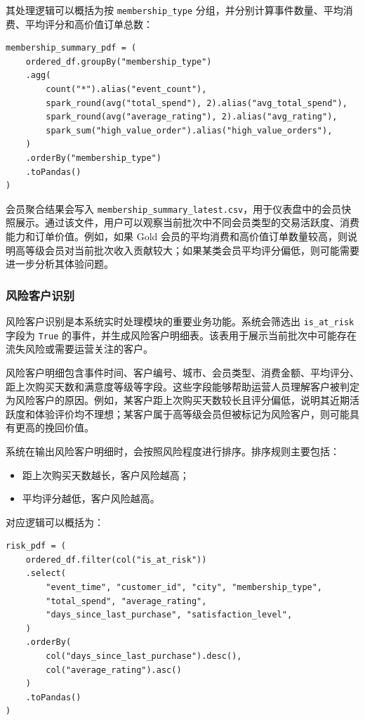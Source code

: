 \documentclass[12pt,hyperref,a4paper,UTF8]{ctexart}
\begin{document}
其处理逻辑可以概括为按 \texttt{membership\_type} 分组，并分别计算事件数量、平均消费、平均评分和高价值订单总数：

\begin{verbatim}
membership_summary_pdf = (
    ordered_df.groupBy("membership_type")
    .agg(
        count("*").alias("event_count"),
        spark_round(avg("total_spend"), 2).alias("avg_total_spend"),
        spark_round(avg("average_rating"), 2).alias("avg_rating"),
        spark_sum("high_value_order").alias("high_value_orders"),
    )
    .orderBy("membership_type")
    .toPandas()
)
\end{verbatim}

会员聚合结果会写入 \texttt{membership\_summary\_latest.csv}，用于仪表盘中的会员快照展示。通过该文件，用户可以观察当前批次中不同会员类型的交易活跃度、消费能力和订单价值。例如，如果 Gold 会员的平均消费和高价值订单数量较高，则说明高等级会员对当前批次收入贡献较大；如果某类会员平均评分偏低，则可能需要进一步分析其体验问题。

\subsubsection{风险客户识别}

风险客户识别是本系统实时处理模块的重要业务功能。系统会筛选出 \texttt{is\_at\_risk} 字段为 \texttt{True} 的事件，并生成风险客户明细表。该表用于展示当前批次中可能存在流失风险或需要运营关注的客户。

风险客户明细包含事件时间、客户编号、城市、会员类型、消费金额、平均评分、距上次购买天数和满意度等级等字段。这些字段能够帮助运营人员理解客户被判定为风险客户的原因。例如，某客户距上次购买天数较长且评分偏低，说明其近期活跃度和体验评价均不理想；某客户属于高等级会员但被标记为风险客户，则可能具有更高的挽回价值。

系统在输出风险客户明细时，会按照风险程度进行排序。排序规则主要包括：
\begin{itemize}
    \item 距上次购买天数越长，客户风险越高；
    \item 平均评分越低，客户风险越高。
\end{itemize}

对应逻辑可以概括为：

\begin{verbatim}
risk_pdf = (
    ordered_df.filter(col("is_at_risk"))
    .select(
        "event_time", "customer_id", "city", "membership_type",
        "total_spend", "average_rating",
        "days_since_last_purchase", "satisfaction_level",
    )
    .orderBy(
        col("days_since_last_purchase").desc(),
        col("average_rating").asc()
    )
    .toPandas()
)
\end{verbatim}
\end{document}
